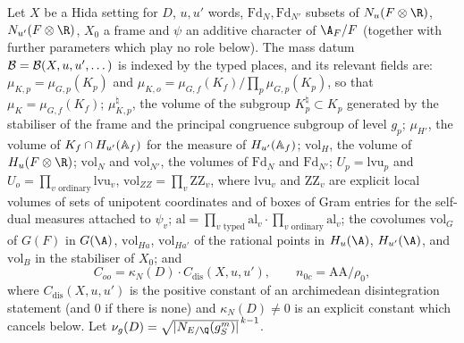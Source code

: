 \begin{definition}\label{pf:multnc:def-bcf}
Let $X$ be a Hida setting for $D$, $u,u'$ words, $\mathrm{Fd}_N,\mathrm{Fd}_{N'}$ subsets of $N_u(F\otimes\R)$,
$N_{u'}(F\otimes\R)$, $X_0$ a frame and $\psi$ an additive character of $\A_F/F$ (together with further parameters which
play no role below). The mass datum $\mathcal{B}=\mathcal{B}(X,u,u',\dots)$ is indexed by the typed places, and its relevant
fields are: $\mu_{K,p}=\mu_{G,p}(K_p)$ and $\mu_{K,o}=\mu_{G,f}(K_f)/\prod_p\mu_{G,p}(K_p)$, so that $\mu_K=\mu_{G,f}(K_f)$;
$\mu^\natural_{K,p}$, the volume of the subgroup $K^\natural_p\subset K_p$ generated by the stabiliser of the frame and the
principal congruence subgroup of level $g_p$; $\mu_{H'}$, the volume of $K_f\cap H_{u'}(\mathbb{A}_{f})$ for the measure of
$H_{u'}(\mathbb{A}_{f})$; $\mathrm{vol}_H$, the volume of $H_u(F\otimes\R)$; $\mathrm{vol}_N$ and $\mathrm{vol}_{N'}$, the volumes
of $\mathrm{Fd}_N$ and $\mathrm{Fd}_{N'}$; $U_p=\mathrm{lvu}_p$ and $U_o=\prod_{v\text{ ordinary}}\mathrm{lvu}_v$,
$\mathrm{vol}_{ZZ}=\prod_v\mathrm{ZZ}_v$, where $\mathrm{lvu}_v$ and $\mathrm{ZZ}_v$ are explicit local volumes of sets of
unipotent coordinates and of boxes of Gram entries for the self-dual measures attached to $\psi_v$;
$\mathrm{al}=\prod_{v\text{ typed}}\mathrm{al}_v\cdot\prod_{v\text{ ordinary}}\mathrm{al}_v$; the covolumes
$\mathrm{vol}_G$ of $G(F)$ in $G(\A)$, $\mathrm{vol}_{Ha}$, $\mathrm{vol}_{Ha'}$ of the rational points in $H_u(\A)$,
$H_{u'}(\A)$, and $\mathrm{vol}_B$ in the stabiliser of $X_0$; and
\[
C_{oo}=\kappa_N(D)\cdot C_{\mathrm{dis}}(X,u,u'),\qquad n_{0c}=\mathrm{AA}/\rho_0,
\]
where $C_{\mathrm{dis}}(X,u,u')$ is the positive constant of an archimedean disintegration statement (and $0$ if there is
none) and $\kappa_N(D)\ne0$ is an explicit constant which cancels below. Let
$\nu_g(D)=\sqrt{|N_{E/\Q}(g_S^m)|}^{\,k-1}$.
\end{definition}


